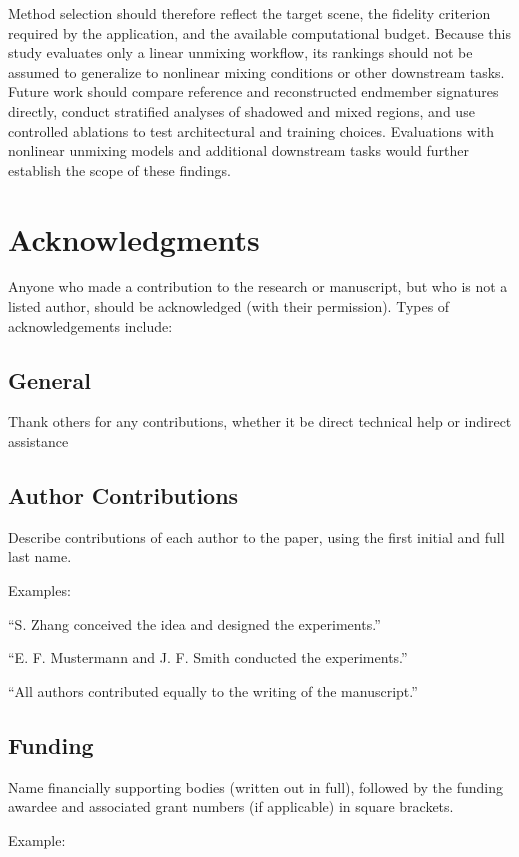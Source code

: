\documentclass{article}
\begin{document}
Method selection should therefore reflect the target scene, the fidelity criterion required by the application, and the available computational budget. Because this study evaluates only a linear unmixing workflow, its rankings should not be assumed to generalize to nonlinear mixing conditions or other downstream tasks. Future work should compare reference and reconstructed endmember signatures directly, conduct stratified analyses of shadowed and mixed regions, and use controlled ablations to test architectural and training choices. Evaluations with nonlinear unmixing models and additional downstream tasks would further establish the scope of these findings.




\section*{Acknowledgments}
Anyone who made a contribution to the research or manuscript, but who is not a listed author, should be acknowledged (with their permission). Types of acknowledgements include:

\subsection*{General}
Thank others for any contributions, whether it be direct technical help or indirect assistance

\subsection*{Author Contributions}
Describe contributions of each author to the paper, using the first initial and full last name.

\medskip Examples:

``S. Zhang conceived the idea and designed the experiments.''

``E. F. Mustermann and J. F. Smith conducted the experiments.''

``All authors contributed equally to the writing of the manuscript.''

\subsection*{Funding}
Name financially supporting bodies (written out in full), followed by the funding awardee and associated grant numbers (if applicable) in square brackets.

\medskip Example:
\end{document}
